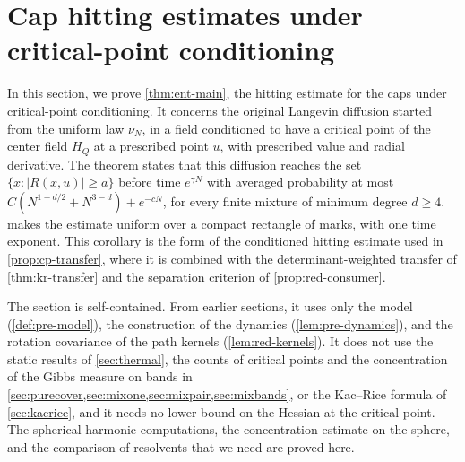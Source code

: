 \chapter{Cap hitting estimates under critical-point conditioning}\label{sec:entrance}

In this section, we prove \cref{thm:ent-main}, the hitting estimate for the
caps under critical-point conditioning. It concerns the original
Langevin diffusion started from the uniform law $\nu_N$, in a field
conditioned to have a critical point of the center field $H_Q$ at a
prescribed point $u$, with prescribed value and radial derivative. The theorem
states that this diffusion reaches the set $\{x:|R(x,u)|\ge a\}$ before
time $e^{\gamma N}$ with averaged probability at most
$C(N^{1-d/2}+N^{3-d})+e^{-cN}$, for every finite mixture of minimum degree
$d\ge4$.  makes the estimate uniform over a compact
rectangle of marks, with one time exponent. This corollary is the form of
the conditioned hitting estimate used in \cref{prop:cp-transfer}, where it is combined with the
determinant-weighted transfer of \cref{thm:kr-transfer} and the separation
criterion of \cref{prop:red-consumer}.

The section is self-contained. From earlier sections, it uses only the model
(\cref{def:pre-model}), the construction of the dynamics
(\cref{lem:pre-dynamics}), and the rotation covariance of the path kernels
(\cref{lem:red-kernels}). It does not use the static results of \cref{sec:thermal},
the counts of critical points and the concentration of the Gibbs measure on
bands in \cref{sec:purecover,sec:mixone,sec:mixpair,sec:mixbands}, or the Kac--Rice formula of
\cref{sec:kacrice}, and it needs no lower bound on the Hessian at the
critical point. The
spherical harmonic computations, the concentration estimate on the sphere,
and the comparison of resolvents that we need are proved here.

